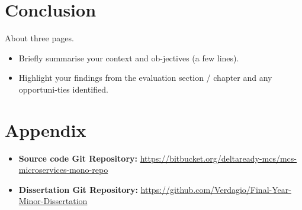 \chapter{Conclusion}
About three pages.

\begin{itemize}
\item Briefly summarise your context and ob-jectives (a few lines).
\item Highlight your findings from the evaluation section / chapter and any opportuni-ties identified.
\end{itemize}

\chapter{Appendix}
\begin{itemize}
\item \textbf{Source code Git Repository:} \url{https://bitbucket.org/deltaready-mcs/mcs-microservices-mono-repo}
\item \textbf{Dissertation Git Repository:} \url{https://github.com/Verdagio/Final-Year-Minor-Dissertation}
\end{itemize}







